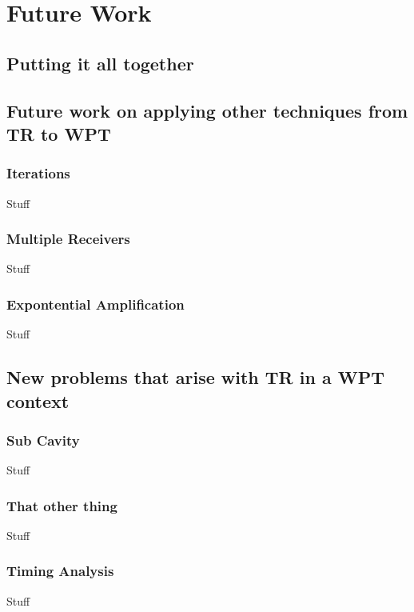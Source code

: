 \chapter{Future Work}
\label{ch:future}


\section{Putting it all together}
\label{sec:future-roadmap}


\section{Future work on applying other techniques from TR to WPT}
\label{sec:future-tr}

\subsection{Iterations}

Stuff

\subsection{Multiple Receivers}

Stuff

\subsection{Expontential Amplification}

Stuff
\section{New problems that arise with TR in a WPT context}


\label{sec:future-wpt}

\subsection{Sub Cavity}

Stuff

\subsection{That other thing}

Stuff

\subsection{Timing Analysis}

Stuff

